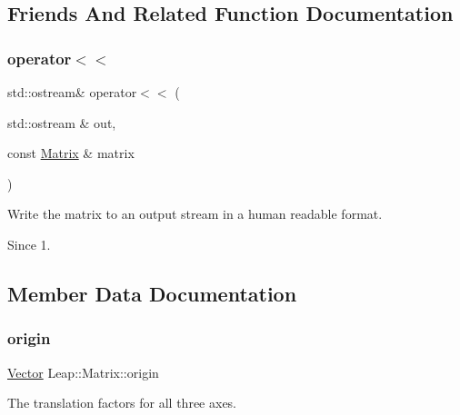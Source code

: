 \subsection{Friends And Related Function Documentation}
\mbox{\label{struct_leap_1_1_matrix_a5e736a2de52898e1930820f93bfdfba4}} 
\subsubsection{\texorpdfstring{operator$<$$<$}{operator<<}}
{\footnotesize\ttfamily std\+::ostream\& operator$<$$<$ (\begin{DoxyParamCaption}\item[{std\+::ostream \&}]{out,  }\item[{const \hyperlink{struct_leap_1_1_matrix}{Matrix} \&}]{matrix }\end{DoxyParamCaption})\hspace{0.3cm}{\ttfamily [friend]}}

Write the matrix to an output stream in a human readable format.


\begin{DoxyCodeInclude}
\end{DoxyCodeInclude}


\begin{DoxySince}{Since}
1. 
\end{DoxySince}


\subsection{Member Data Documentation}
\mbox{\label{struct_leap_1_1_matrix_a64cc576f42312999153c26b6b558fb9d}} 
\subsubsection{\texorpdfstring{origin}{origin}}
{\footnotesize\ttfamily \hyperlink{struct_leap_1_1_vector}{Vector} Leap\+::\+Matrix\+::origin}

The translation factors for all three axes.


\begin{DoxyCodeInclude}
\end{DoxyCodeInclude}


